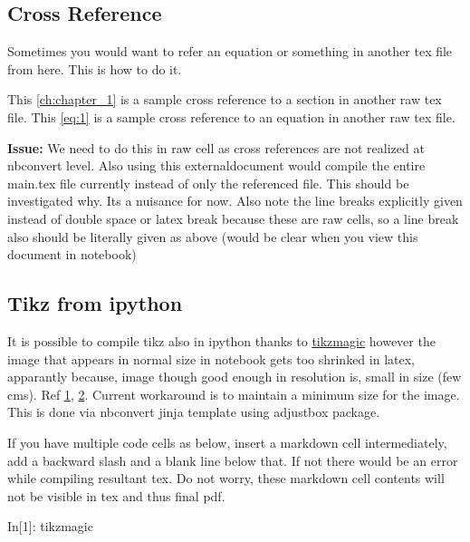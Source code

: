 \documentclass[float=false,crop=false]{standalone}
\begin{document}
    \subsection{Cross Reference}\label{cross-reference}

Sometimes you would want to refer an equation or something in another
tex file from here. This is how to do it.

This \ref{ch:chapter_1} is a sample cross reference to a section in another raw tex file. 
This \ref{eq:1} is a sample cross reference to an equation in another raw tex file.

    \textbf{Issue:} We need to do this in raw cell as cross references are
not realized at nbconvert level. Also using this externaldocument would
compile the entire main.tex file currently instead of only the
referenced file. This should be investigated why. Its a nuisance for
now. Also note the line breaks explicitly given instead of double space
or latex break because these are raw cells, so a line break also should
be literally given as above (would be clear when you view this document
in notebook)

    \subsection{Tikz from ipython}\label{tikz-from-ipython}

It is possible to compile tikz also in ipython thanks to
\href{https://github.com/mkrphys/ipython-tikzmagic}{tikzmagic} however
the image that appears in normal size in notebook gets too shrinked in
latex, apparantly because, image though good enough in resolution is,
small in size (few cms). Ref
\href{https://tex.stackexchange.com/questions/452720/weird-image-scaling-in-tex}{1},
\href{https://github.com/mkrphys/ipython-tikzmagic/issues/27}{2}.
Current workaround is to maintain a minimum size for the image. This is
done via nbconvert jinja template using adjustbox package.

If you have multiple code cells as below, insert a markdown cell
intermediately, add a backward slash and a blank line below that. If not
there would be an error while compiling resultant tex. Do not worry,
these markdown cell contents will not be visible in tex and thus final
pdf.
\begin{InVerbatim}[commandchars=\\\{\},fontsize=\scriptsize]
{\color{incolor}In[{\color{incolor}1}]:}  tikzmagic
\end{InVerbatim}
    
\end{document}
